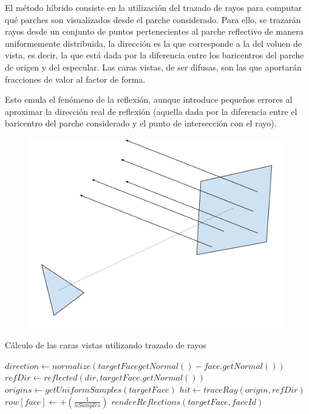 El método híbrido consiste en la utilización del trazado de rayos para computar qué parches son visualizados desde el parche considerado. Para ello, se trazarán rayos desde un conjunto de puntos pertenecientes al parche reflectivo de manera uniformemente distribuida, la dirección es la que corresponde a la del voluen de vista, es decir, la que está dada por la diferencia entre los baricentros del parche de origen y del especular. Las caras vistas, de ser difusas, son las que aportarán fracciones de valor al factor de forma.

Esto emula el fenómeno de la reflexión, aunque introduce pequeños errores al aproximar la dirección real de reflexión (aquella dada por la diferencia entre el baricentro del parche considerado y el punto de intersección con el rayo).

\begin{figure}[H]
	\centering
	\includegraphics[width=.8\linewidth]{assets/Hibrido}
	\label{img:hibrido}
\end{figure}

\begin{algorithm}
	\caption{Cálculo de las caras vistas utilizando trazado de rayos}
	\label{alg:processHemicube}
	\begin{algorithmic}
			\State $direction \gets normalize(targetFacegetNormal() - face.getNormal())$
			\State $refDir \gets reflected(dir, targetFace.getNormal())$
			\State $origins \gets getUniformSamples(targetFace)$
				\State $hit \gets traceRay(origin, refDir)$
				\State $row[face] \gets +(\frac{1}{nSamples})$
						\State $renderReflections(targetFace, faceId)$
					\EndIf
				\EndIf
			\EndLoop
		\EndFunction
	\end{algorithmic}
\end{algorithm}

